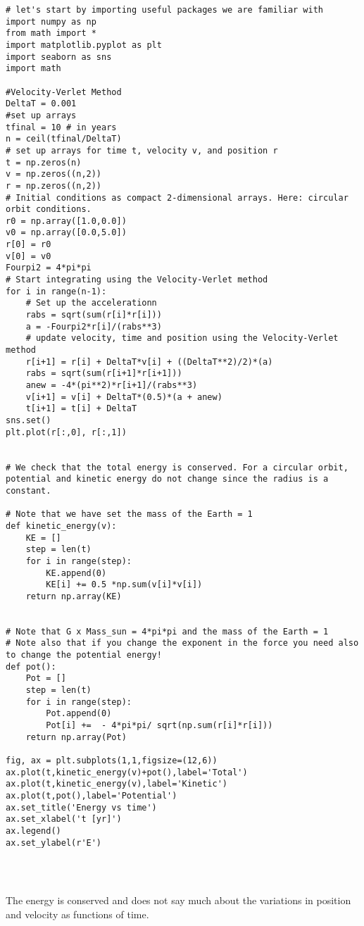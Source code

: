 \documentclass[%
oneside,                 %
final,                   %
10pt]{article}
\begin{document}
\begin{verbatim}
# let's start by importing useful packages we are familiar with
import numpy as np
from math import *
import matplotlib.pyplot as plt
import seaborn as sns
import math 

#Velocity-Verlet Method
DeltaT = 0.001
#set up arrays 
tfinal = 10 # in years
n = ceil(tfinal/DeltaT)
# set up arrays for time t, velocity v, and position r
t = np.zeros(n)
v = np.zeros((n,2))
r = np.zeros((n,2))
# Initial conditions as compact 2-dimensional arrays. Here: circular orbit conditions.
r0 = np.array([1.0,0.0])
v0 = np.array([0.0,5.0])
r[0] = r0
v[0] = v0
Fourpi2 = 4*pi*pi
# Start integrating using the Velocity-Verlet method
for i in range(n-1):
    # Set up the accelerationn
    rabs = sqrt(sum(r[i]*r[i]))
    a = -Fourpi2*r[i]/(rabs**3)
    # update velocity, time and position using the Velocity-Verlet  method
    r[i+1] = r[i] + DeltaT*v[i] + ((DeltaT**2)/2)*(a)
    rabs = sqrt(sum(r[i+1]*r[i+1]))
    anew = -4*(pi**2)*r[i+1]/(rabs**3)
    v[i+1] = v[i] + DeltaT*(0.5)*(a + anew)
    t[i+1] = t[i] + DeltaT
sns.set()
plt.plot(r[:,0], r[:,1])


# We check that the total energy is conserved. For a circular orbit, potential and kinetic energy do not change since the radius is a constant. 

# Note that we have set the mass of the Earth = 1
def kinetic_energy(v):
    KE = []
    step = len(t)
    for i in range(step):
        KE.append(0)
        KE[i] += 0.5 *np.sum(v[i]*v[i])
    return np.array(KE)


# Note that G x Mass_sun = 4*pi*pi and the mass of the Earth = 1
# Note also that if you change the exponent in the force you need also to change the potential energy!
def pot():
    Pot = []
    step = len(t)
    for i in range(step):
        Pot.append(0)
        Pot[i] +=  - 4*pi*pi/ sqrt(np.sum(r[i]*r[i]))
    return np.array(Pot)

fig, ax = plt.subplots(1,1,figsize=(12,6))
ax.plot(t,kinetic_energy(v)+pot(),label='Total')
ax.plot(t,kinetic_energy(v),label='Kinetic')
ax.plot(t,pot(),label='Potential')
ax.set_title('Energy vs time')
ax.set_xlabel('t [yr]')
ax.legend()
ax.set_ylabel(r'E')




\end{verbatim}


The energy is conserved and does not say much about the variations in position and velocity as functions of time.
\end{document}

